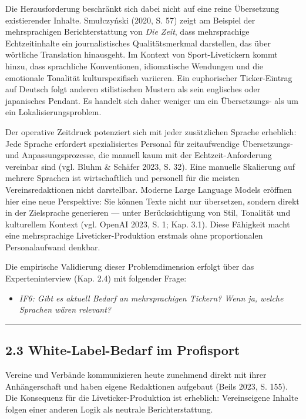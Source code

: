 Die Herausforderung beschränkt sich dabei nicht auf eine reine
Übersetzung existierender Inhalte. Smułczyński (2020, S. 57) zeigt am
Beispiel der mehrsprachigen Berichterstattung von \emph{Die Zeit}, dass
mehrsprachige Echtzeitinhalte ein journalistisches Qualitätsmerkmal
darstellen, das über wörtliche Translation hinausgeht. Im Kontext von
Sport-Livetickern kommt hinzu, dass sprachliche Konventionen,
idiomatische Wendungen und die emotionale Tonalität kulturspezifisch
variieren. Ein euphorischer Ticker-Eintrag auf Deutsch folgt anderen
stilistischen Mustern als sein englisches oder japanisches Pendant. Es
handelt sich daher weniger um ein Übersetzungs- als um ein
Lokalisierungsproblem.

Der operative Zeitdruck potenziert sich mit jeder zusätzlichen Sprache
erheblich: Jede Sprache erfordert spezialisiertes Personal für
zeitaufwendige Übersetzungs- und Anpassungsprozesse, die manuell kaum
mit der Echtzeit-Anforderung vereinbar sind (vgl. Bluhm \& Schäfer 2023,
S. 32). Eine manuelle Skalierung auf mehrere Sprachen ist wirtschaftlich
und personell für die meisten Vereinsredaktionen nicht darstellbar.
Moderne Large Language Models eröffnen hier eine neue Perspektive: Sie
können Texte nicht nur übersetzen, sondern direkt in der Zielsprache
generieren --- unter Berücksichtigung von Stil, Tonalität und
kulturellem Kontext (vgl. OpenAI 2023, S. 1; Kap. 3.1). Diese Fähigkeit
macht eine mehrsprachige Liveticker-Produktion erstmals ohne
proportionalen Personalaufwand denkbar.

Die empirische Validierung dieser Problemdimension erfolgt über das
Experteninterview (Kap. 2.4) mit folgender Frage:

\begin{itemize}
\tightlist
\item
  \emph{IF6: Gibt es aktuell Bedarf an mehrsprachigen Tickern? Wenn ja,
  welche Sprachen wären relevant?}
\end{itemize}

\begin{center}\rule{0.5\linewidth}{0.5pt}\end{center}

\subsection{2.3 White-Label-Bedarf im
Profisport}\label{white-label-bedarf-im-profisport}

Vereine und Verbände kommunizieren heute zunehmend direkt mit ihrer
Anhängerschaft und haben eigene Redaktionen aufgebaut (Beils 2023, S.
155). Die Konsequenz für die Liveticker-Produktion ist erheblich:
Vereinseigene Inhalte folgen einer anderen Logik als neutrale
Berichterstattung.

